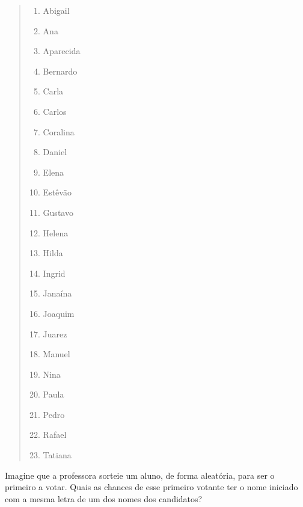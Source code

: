 \begin{quote}
\begin{multicols}{2}
\begin{enumerate}
\item Abigail

\item Ana

\item Aparecida

\item Bernardo

\item Carla

\item Carlos

\item Coralina

\item Daniel 

\item Elena

\item Estêvão

\item Gustavo

\item Helena

\item Hilda

\item Ingrid

\item Janaína

\item Joaquim

\item Juarez

\item Manuel

\item Nina

\item Paula

\item Pedro

\item Rafael

\item Tatiana
\end{enumerate}
\end{multicols}
\end{quote}

Imagine que a professora sorteie um aluno, de forma aleatória, para ser o primeiro a votar. Quais as chances de esse primeiro votante ter o nome iniciado com a mesma letra de um dos nomes dos candidatos?

